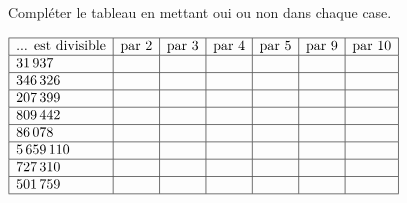 {\begin{Exercice}
\end{Exercice}

\begin{Exercice}
Compléter le tableau en mettant oui ou non dans chaque case.\\


 \begin{minipage}[t]{\linewidth}
\begin{center}


$\begin{array}{|l|c|c|c|c|c|c|}
\hline
\text{... est divisible} & \text{par }2 & \text{par }3 & \text{par }4 & \text{par }5 & \text{par }9 & \text{par }10\\
\hline
31\,937 & & & & & & \\
\hline
346\,326 & & & & & & \\
\hline
207\,399 & & & & & & \\
\hline
809\,442 & & & & & & \\
\hline
86\,078 & & & & & & \\
\hline
5\,659\,110 & & & & & & \\
\hline
727\,310 & & & & & & \\
\hline
501\,759 & & & & & & \\
\hline
\end{array}$



\end{center}
\end{minipage}

\end{Exercice}

\newpage

\begin{Exercice}
\leavevmode\vspace{-\baselineskip}


\end{Exercice}}
